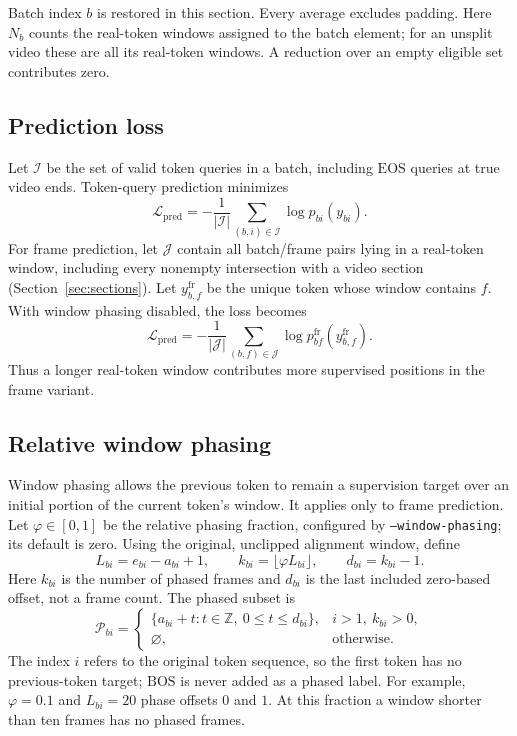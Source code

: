 \documentclass[11pt,a4paper]{article}
\newcommand{\BOS}{\mathrm{BOS}}
\newcommand{\EOS}{\mathrm{EOS}}
\numberwithin{equation}{section}
\begin{document}
Batch index $b$ is restored in this section. Every average excludes
padding. Here $N_b$ counts the real-token windows assigned to the batch
element; for an unsplit video these are all its real-token windows.
A reduction over an empty eligible set contributes zero.

\subsection{Prediction loss}

Let $\mathcal I$ be the set of valid token queries in a batch, including
$\EOS$ queries at true video ends. Token-query prediction minimizes
\begin{equation}
\mathcal L_{\mathrm{pred}}
=-\frac{1}{|\mathcal I|}
 \sum_{(b,i)\in\mathcal I}\log p_{bi}(y_{bi}).
\label{eq:token-ce}
\end{equation}
For frame prediction, let $\mathcal J$ contain all batch/frame pairs
lying in a real-token window, including every nonempty intersection
with a video section (Section~\ref{sec:sections}). Let
$y_{b,f}^{\mathrm{fr}}$ be the unique token whose window contains
$f$. With window phasing disabled, the loss becomes
\begin{equation}
\mathcal L_{\mathrm{pred}}
=-\frac{1}{|\mathcal J|}
 \sum_{(b,f)\in\mathcal J}\log p_{bf}^{\mathrm{fr}}(y_{b,f}^{\mathrm{fr}}).
\label{eq:frame-ce}
\end{equation}
Thus a longer real-token window contributes more supervised positions
in the frame variant.

\subsection{Relative window phasing}
\label{sec:window-phasing}

Window phasing allows the previous token to remain a supervision target
over an initial portion of the current token's window. It applies only
to frame prediction. Let $\varphi\in[0,1]$ be the relative phasing
fraction, configured by \texttt{--window-phasing}; its default is zero.
Using the original, unclipped alignment window, define
\begin{equation}
L_{bi}=e_{bi}-a_{bi}+1,\qquad
k_{bi}=\lfloor\varphi L_{bi}\rfloor,\qquad
d_{bi}=k_{bi}-1.
\label{eq:phase-length}
\end{equation}
Here $k_{bi}$ is the number of phased frames and $d_{bi}$ is the last
included zero-based offset, not a frame count. The phased subset is
\begin{equation}
\mathcal P_{bi}=
\begin{cases}
\{a_{bi}+t: t\in\mathbb Z,\ 0\leq t\leq d_{bi}\},&i>1,\ k_{bi}>0,\\
\varnothing,&\text{otherwise}.
\end{cases}
\label{eq:phase-subset}
\end{equation}
The index $i$ refers to the original token sequence, so the first token
has no previous-token target; $\BOS$ is never added as a phased label.
For example, $\varphi=0.1$ and $L_{bi}=20$ phase offsets $0$ and $1$.
At this fraction a window shorter than ten frames has no phased frames.
\end{document}
